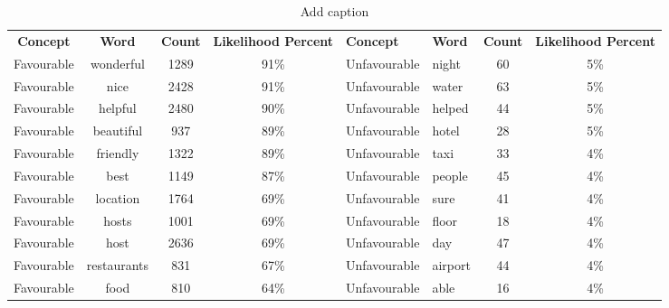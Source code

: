 \documentclass[a4paper, 12pt]{article}
\begin{document}
\newpage
\begin{table}[htbp]
  \centering
  \caption{Add caption}
    \begin{tabular}{ccccp{5.715em}p{4.715em}cc}
    \multicolumn{1}{p{4.715em}}{\textbf{Concept}} & \multicolumn{1}{p{4.715em}}{\textbf{Word}} & \multicolumn{1}{p{3.785em}}{\textbf{ Count}} & \multicolumn{1}{p{4.715em}}{\textbf{Likelihood Percent}} & \textbf{Concept} & \textbf{Word} & \multicolumn{1}{p{3.57em}}{\textbf{ Count}} & \multicolumn{1}{p{4.145em}}{\textbf{Likelihood Percent}} \\
    \multicolumn{1}{p{4.715em}}{Favourable} & \multicolumn{1}{p{4.715em}}{wonderful} & 1289  & 91\%  & Unfavourable & night & 60    & 5\% \\
    \multicolumn{1}{p{4.715em}}{Favourable} & \multicolumn{1}{p{4.715em}}{nice} & 2428  & 91\%  & Unfavourable & water & 63    & 5\% \\
    \multicolumn{1}{p{4.715em}}{Favourable} & \multicolumn{1}{p{4.715em}}{helpful} & 2480  & 90\%  & Unfavourable & helped & 44    & 5\% \\
    \multicolumn{1}{p{4.715em}}{Favourable} & \multicolumn{1}{p{4.715em}}{beautiful} & 937   & 89\%  & Unfavourable & hotel & 28    & 5\% \\
    \multicolumn{1}{p{4.715em}}{Favourable} & \multicolumn{1}{p{4.715em}}{friendly} & 1322  & 89\%  & Unfavourable & taxi  & 33    & 4\% \\
    \multicolumn{1}{p{4.715em}}{Favourable} & \multicolumn{1}{p{4.715em}}{best} & 1149  & 87\%  & Unfavourable & people & 45    & 4\% \\
    \multicolumn{1}{p{4.715em}}{Favourable} & \multicolumn{1}{p{4.715em}}{location} & 1764  & 69\%  & Unfavourable & sure  & 41    & 4\% \\
    \multicolumn{1}{p{4.715em}}{Favourable} & \multicolumn{1}{p{4.715em}}{hosts} & 1001  & 69\%  & Unfavourable & floor & 18    & 4\% \\
    \multicolumn{1}{p{4.715em}}{Favourable} & \multicolumn{1}{p{4.715em}}{host} & 2636  & 69\%  & Unfavourable & day   & 47    & 4\% \\
    \multicolumn{1}{p{4.715em}}{Favourable} & \multicolumn{1}{p{4.715em}}{restaurants} & 831   & 67\%  & Unfavourable & airport & 44    & 4\% \\
    \multicolumn{1}{p{4.715em}}{Favourable} & \multicolumn{1}{p{4.715em}}{food} & 810   & 64\%  & Unfavourable & able  & 16    & 4\% \\

\end{tabular}
\end{table}
\end{document}

